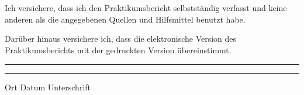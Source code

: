 
\chapter*{}

Ich versichere, dass ich den Praktikumsbericht selbstständig verfasst und keine anderen als die angegebenen Quellen und Hilfsmittel benutzt habe.

Darüber hinaus versichere ich, dass die elektronische Version des Praktikumsberichts mit der gedruckten Version übereinstimmt.

\vspace{50pt}
\noindent\rule{5cm}{.4pt}\hfill\rule{5cm}{.4pt}\par
\noindent Ort Datum \hfill Unterschrift

